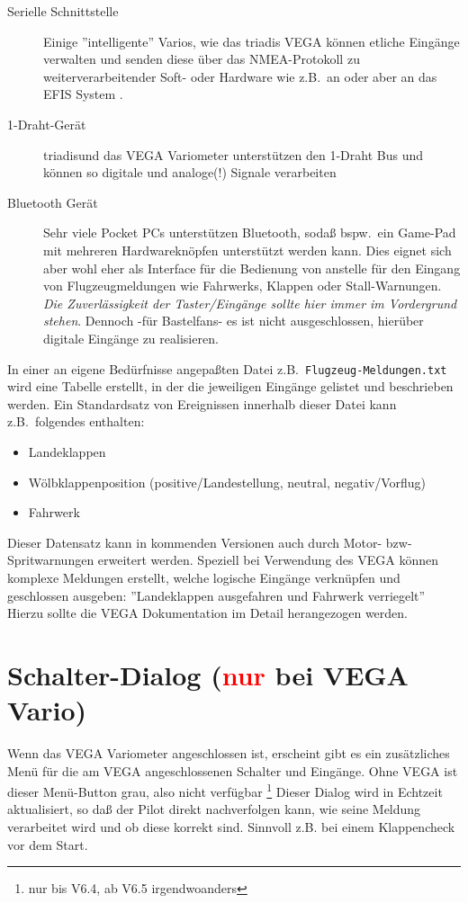 \begin{description}
     \item[Serielle Schnittstelle]  Einige ''intelligente'' Varios, wie das \textsf{triadis} VEGA  können etliche Eingänge verwalten und senden diese über das NMEA-Protokoll zu weiterverarbeitender Soft- oder Hardware wie z.B.\ an \xc oder aber an das EFIS System \al.
     \item[1-Draht-Gerät]  \textsf{triadis}\al und das VEGA Variometer unterstützen den 1-Draht Bus und können so digitale und analoge(!) Signale verarbeiten
     \item[Bluetooth Gerät]  Sehr viele Pocket \textsf{PC}s unterstützen Bluetooth, sodaß bspw.\ ein Game-Pad mit mehreren  Hardwareknöpfen unterstützt werden kann. 
     Dies eignet sich aber wohl eher als Interface für die Bedienung von \xc anstelle für den Eingang von Flugzeugmeldungen wie Fahrwerks, Klappen oder Stall-Warnungen.
     \textsl{Die Zuverlässigkeit der Taster/Eingänge sollte hier immer im Vordergrund stehen}.
        Dennoch -für Bastelfans- es ist nicht ausgeschlossen, hierüber digitale Eingänge zu realisieren.
\end{description}

In einer an eigene Bedürfnisse angepaßten Datei z.B.\ \texttt{Flugzeug-Meldungen.txt} wird eine Tabelle erstellt, in der die jeweiligen Eingänge gelistet und beschrieben werden. Ein Standardsatz von Ereignissen innerhalb dieser Datei  kann z.B.\ folgendes enthalten:
\begin{itemize}
  \item Landeklappen
  \item Wölbklappenposition (positive/Landestellung, neutral, negativ/Vorflug)
  \item Fahrwerk
\end{itemize}

\halt Dieser Datensatz kann in kommenden Versionen auch durch Motor- bzw- Spritwarnungen erweitert werden.
Speziell bei Verwendung des VEGA können komplexe Meldungen erstellt, welche logische Eingänge verknüpfen und geschlossen ausgeben: ''Landeklappen ausgefahren und Fahrwerk verriegelt''  Hierzu sollte die VEGA Dokumentation im Detail herangezogen werden.
\section{Schalter-Dialog (\textcolor{red}{nur} bei VEGA Vario)}

Wenn das VEGA Variometer angeschlossen ist, erscheint gibt es ein zusätzliches Menü für die am VEGA angeschlossenen Schalter und Eingänge. Ohne VEGA ist dieser Menü-Button grau, also nicht verfügbar \footnote{nur bis V6.4, ab V6.5 irgendwoanders}%
Dieser Dialog wird in Echtzeit aktualisiert, so daß der Pilot direkt nachverfolgen kann, wie seine Meldung verarbeitet wird und ob diese korrekt sind. 
Sinnvoll z.B. bei einem Klappencheck vor dem Start.


